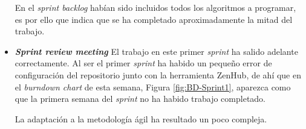 \begin{itemize}
En el \textit{sprint backlog} habían sido incluidos todos los algoritmos a programar, es por ello que indica que se ha completado aproximadamente la mitad del trabajo.

\item \textbf{\textit{Sprint review meeting}}
El trabajo en este primer \textit{sprint} ha salido adelante correctamente. Al ser el primer \textit{sprint} ha habido un pequeño error de configuración del repositorio junto con la herramienta ZenHub, de ahí que en el \textit{burndown chart} de esta semana, Figura \ref{fig:BD-Sprint1}, aparezca como que la primera semana del \textit{sprint} no ha habido trabajo completado.

La adaptación a la metodología ágil ha resultado un poco compleja.
\end{itemize}

